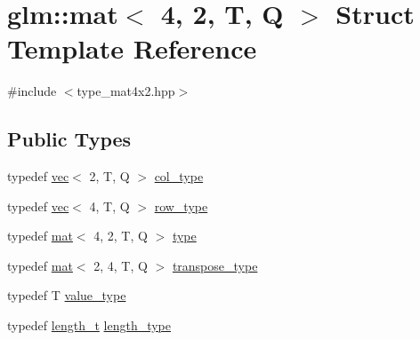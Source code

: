 \hypertarget{structglm_1_1mat_3_014_00_012_00_01_t_00_01_q_01_4}{}\section{glm\+:\+:mat$<$ 4, 2, T, Q $>$ Struct Template Reference}
\label{structglm_1_1mat_3_014_00_012_00_01_t_00_01_q_01_4}


{\ttfamily \#include $<$type\+\_\+mat4x2.\+hpp$>$}

\subsection*{Public Types}
\begin{DoxyCompactItemize}
\item 
typedef \hyperlink{structglm_1_1vec}{vec}$<$ 2, T, Q $>$ \hyperlink{structglm_1_1mat_3_014_00_012_00_01_t_00_01_q_01_4_a60138ab077eb3bef96e654e672af5059}{col\+\_\+type}
\item 
typedef \hyperlink{structglm_1_1vec}{vec}$<$ 4, T, Q $>$ \hyperlink{structglm_1_1mat_3_014_00_012_00_01_t_00_01_q_01_4_a33d6c2074d5507b728a6e2e91a84f6a8}{row\+\_\+type}
\item 
typedef \hyperlink{structglm_1_1mat}{mat}$<$ 4, 2, T, Q $>$ \hyperlink{structglm_1_1mat_3_014_00_012_00_01_t_00_01_q_01_4_aecca78e9fbf467c7558b6018401c3f29}{type}
\item 
typedef \hyperlink{structglm_1_1mat}{mat}$<$ 2, 4, T, Q $>$ \hyperlink{structglm_1_1mat_3_014_00_012_00_01_t_00_01_q_01_4_ab74329af13d01d0d1bdac3ea3619fc68}{transpose\+\_\+type}
\item 
typedef T \hyperlink{structglm_1_1mat_3_014_00_012_00_01_t_00_01_q_01_4_aad6b55a7bcab7ce036cd5d5f5b963c6e}{value\+\_\+type}
\item 
typedef \hyperlink{namespaceglm_a090a0de2260835bee80e71a702492ed9}{length\+\_\+t} \hyperlink{structglm_1_1mat_3_014_00_012_00_01_t_00_01_q_01_4_a4b192a2630331f70ca61657d9783026e}{length\+\_\+type}
\end{DoxyCompactItemize}
